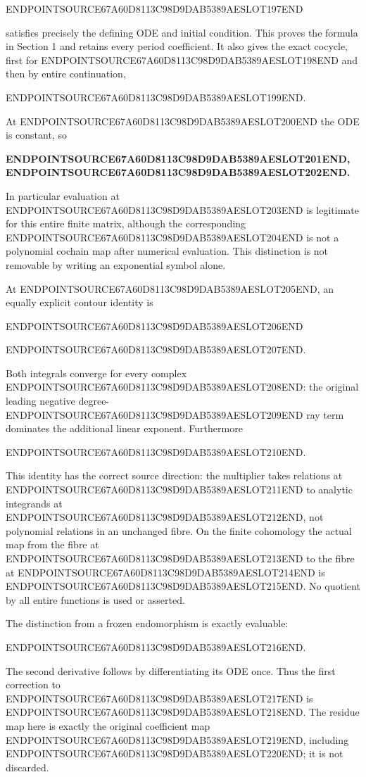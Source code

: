 ENDPOINTSOURCE67A60D8113C98D9DAB5389AESLOT197END

satisfies precisely the defining ODE and initial condition. This proves the formula in Section 1 and retains every period coefficient. It also gives the exact cocycle, first for ENDPOINTSOURCE67A60D8113C98D9DAB5389AESLOT198END and then by entire continuation,

ENDPOINTSOURCE67A60D8113C98D9DAB5389AESLOT199END.

At ENDPOINTSOURCE67A60D8113C98D9DAB5389AESLOT200END the ODE is constant, so

\textbf{ENDPOINTSOURCE67A60D8113C98D9DAB5389AESLOT201END, ENDPOINTSOURCE67A60D8113C98D9DAB5389AESLOT202END.}

In particular evaluation at ENDPOINTSOURCE67A60D8113C98D9DAB5389AESLOT203END is legitimate for this entire finite matrix, although the corresponding ENDPOINTSOURCE67A60D8113C98D9DAB5389AESLOT204END is not a polynomial cochain map after numerical evaluation. This distinction is not removable by writing an exponential symbol alone.

At ENDPOINTSOURCE67A60D8113C98D9DAB5389AESLOT205END, an equally explicit contour identity is

ENDPOINTSOURCE67A60D8113C98D9DAB5389AESLOT206END

ENDPOINTSOURCE67A60D8113C98D9DAB5389AESLOT207END.

Both integrals converge for every complex ENDPOINTSOURCE67A60D8113C98D9DAB5389AESLOT208END: the original leading negative degree-ENDPOINTSOURCE67A60D8113C98D9DAB5389AESLOT209END ray term dominates the additional linear exponent. Furthermore

ENDPOINTSOURCE67A60D8113C98D9DAB5389AESLOT210END.

This identity has the correct source direction: the multiplier takes relations at ENDPOINTSOURCE67A60D8113C98D9DAB5389AESLOT211END to analytic integrands at ENDPOINTSOURCE67A60D8113C98D9DAB5389AESLOT212END, not polynomial relations in an unchanged fibre. On the finite cohomology the actual map from the fibre at ENDPOINTSOURCE67A60D8113C98D9DAB5389AESLOT213END to the fibre at ENDPOINTSOURCE67A60D8113C98D9DAB5389AESLOT214END is ENDPOINTSOURCE67A60D8113C98D9DAB5389AESLOT215END. No quotient by all entire functions is used or asserted.

The distinction from a frozen endomorphism is exactly evaluable:

ENDPOINTSOURCE67A60D8113C98D9DAB5389AESLOT216END.

The second derivative follows by differentiating its ODE once. Thus the first correction to ENDPOINTSOURCE67A60D8113C98D9DAB5389AESLOT217END is ENDPOINTSOURCE67A60D8113C98D9DAB5389AESLOT218END. The residue map here is exactly the original coefficient map ENDPOINTSOURCE67A60D8113C98D9DAB5389AESLOT219END, including ENDPOINTSOURCE67A60D8113C98D9DAB5389AESLOT220END; it is not discarded.

